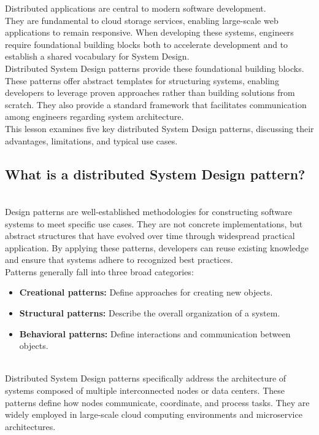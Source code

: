 

Distributed applications are central to modern software development.
\\
They are fundamental to cloud storage services, enabling large-scale web applications to remain responsive. When developing these systems, engineers require foundational building blocks both to accelerate development and to establish a shared vocabulary for System Design.
\\
Distributed System Design patterns provide these foundational building blocks.
\\
These patterns offer abstract templates for structuring systems, enabling developers to leverage proven approaches rather than building solutions from scratch. They also provide a standard framework that facilitates communication among engineers regarding system architecture.
\\
This lesson examines five key distributed System Design patterns, discussing their advantages, limitations, and typical use cases.

\subsection{What is a distributed System Design pattern?}\label{jLP8Uza3OtH8_Jp0lhTRJ}
\\
Design patterns are well-established methodologies for constructing software systems to meet specific use cases. They are not concrete implementations, but abstract structures that have evolved over time through widespread practical application. By applying these patterns, developers can reuse existing knowledge and ensure that systems adhere to recognized best practices.
\\
Patterns generally fall into three broad categories:

\begin{itemize}
\item
\protect{}\label{oknOb0F58xFuClGyz35zM}
\textbf{Creational patterns:} Define approaches for creating new objects.
\item
\protect{}\label{zcvv4qPrEdzcuVpaO3Kw1}
\textbf{Structural patterns:} Describe the overall organization of a system.
\item
\protect{}\label{AwIsURGsdiab_U14xl41t}
\textbf{Behavioral patterns:} Define interactions and communication between objects.
\end{itemize}
\\
Distributed System Design patterns specifically address the architecture of systems composed of multiple interconnected nodes or data centers. These patterns define how nodes communicate, coordinate, and process tasks. They are widely employed in large-scale cloud computing environments and microservice architectures.

